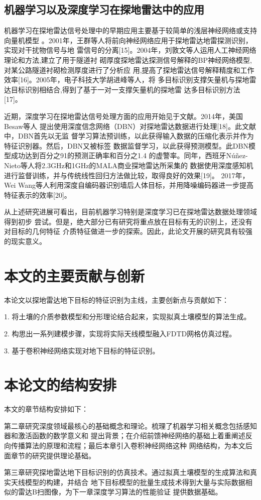 \subsection{机器学习以及深度学习在探地雷达中的应用}
机器学习在探地雷达信号处理中的早期应用主要基于较简单的浅层神经网络或支持向量机模型
。2001年，王群等人将前向神经网络应用于探地雷达地雷探测识别，实现对干扰物信号与地
雷信号的分离[15]。2004年，刘敦文等人运用人工神经网络理论和方法,建立了用于隧道衬
砌厚度探地雷达探测信号解释的BP神经网络模型,对某公路隧道衬砌检测厚度进行了分析应
用,提高了探地雷达信号解释精度和工作效率[16]。2005年，电子科技大学胡进峰等人，将
多目标识别支撑矢量机与探地雷达目标识别相结合,得到了基于一对一支撑矢量机的探地雷
达多目标识别方法[17]。

近期，深度学习在探地雷达信号处理方面的应用开始见于文献。2014年，美国Besaw等人
提出使用深度信念网络（DBN）对探地雷达数据进行处理[18]。此文献中，DBN首先以无监
督学习算法预训练，以此获得输入数据的压缩化表示并作为特征识别器。然后，DBN又被标签
数据监督学习，以此获得预测模型。此DBN模型成功达到百分之91的预测正确率和百分之1.4
的虚警率。同年，西班牙Núñez-Nieto等人将2.3GHz和1GHz的MALA商业探地雷达所采集的
数据使用深度感知机进行监督训练，并与传统线性回归方法做比较，取得良好的效果[19]。
2017年，Wei Wang等人利用深度自编码器识别墙后人体目标，并用降噪编码器进一步提高
特征表示的效率[20]。

从上述研究进展可看出，目前机器学习特别是深度学习已在探地雷达数据处理领域得到初步
尝试。但是，绝大部分已有研究将重点放在目标有无的识别上，还没有对目标的几何特征
介质特征做进一步的探索。因此，此论文开展的研究具有较强的现实意义。
\section{本文的主要贡献与创新}
本论文以探地雷达地下目标的特征识别为主线，主要创新点与贡献如下：

1. 将土壤的介质参数模型和分形理论结合起来，实现拟真土壤模型的算法生成。

2. 构思出一系列建模步骤，实现将实际天线模型融入FDTD网格仿真过程。

3. 基于卷积神经网络实现对地下目标的特征识别。
\section{本论文的结构安排}
本文的章节结构安排如下：

第二章研究深度领域最核心的基础概念和理论。梳理了机器学习相关概念包括感知器和激活函数的数学意义和
提出背景；在介绍前馈神经网络的基础上着重阐述反向传播算法的原理和流程；最后本章引入卷积神经网络这种
网络结构，为本文后面章节的研究提供理论基础。

第三章研究探地雷达地下目标识别的仿真技术。通过拟真土壤模型的生成算法和真实天线模型的构建，并结合
地下目标模型的批量生成技术得到大量与实际数据相似的雷达B扫图像，为下一章深度学习算法的性能验证
提供数据基础。

